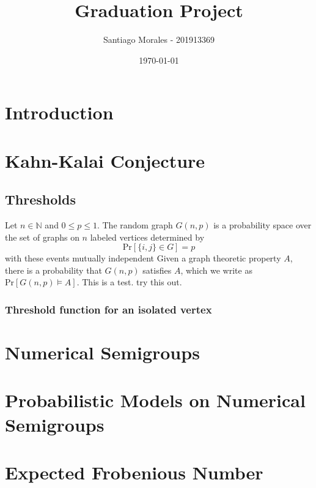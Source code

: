 \documentclass[12pt]{article}
\def\N{\ensuremath{\mathbb{N}}}
\begin{document}
\title{Graduation Project}
\author{Santiago Morales - 201913369}
\date{\today}

\maketitle
\section{Introduction}

\section{Kahn-Kalai Conjecture}
\subsection{Thresholds}
Let $n \in \N$ and $0 \leq p \leq 1$. The random graph $G(n, p)$ is a probability space over the set of graphs on $n$ labeled vertices determined by
\[\text{Pr}[\{i, j\} \in G] = p\] 
with these events mutually independent \cite{alon2016probabilistic} Given a graph theoretic property $A$, there is a probability that $G(n, p)$ satisfies $A$, which we write as $\text{Pr}[G(n, p) \vDash A]$. This is a test. try this out.


\subsubsection{Threshold function for an isolated vertex}

\subsection{}
\section{Numerical Semigroups}

\section{Probabilistic Models on Numerical Semigroups}

\section{Expected Frobenious Number}



\end{document}
